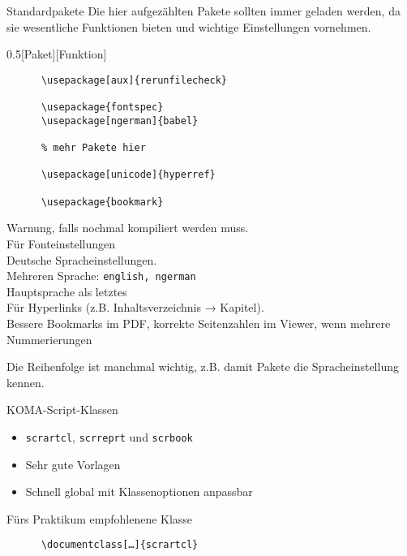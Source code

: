 \begin{frame}[fragile]{Standardpakete}
  Die hier aufgezählten Pakete sollten immer geladen werden, da sie wesentliche Funktionen bieten und wichtige Einstellungen vornehmen.
  \vspace{-1em}
  \begin{CodeExplanation}{0.5}[Paket][Funktion]
    \begin{verbatim}
      \usepackage[aux]{rerunfilecheck}

      \usepackage{fontspec}
      \usepackage[ngerman]{babel}

      % mehr Pakete hier

      \usepackage[unicode]{hyperref}

      \usepackage{bookmark}
    \end{verbatim}
  \Explanation
    Warnung, falls nochmal kompiliert werden muss. \\[\baselineskip]
    Für Fonteinstellungen \\
    Deutsche Spracheinstellungen. \\
    Mehreren Sprache: \texttt{english, ngerman} \\
    Hauptsprache als letztes \\[\baselineskip]
    Für Hyperlinks (z.B. Inhaltsverzeichnis → Kapitel). \\
    Bessere Bookmarks im PDF,
    korrekte Seitenzahlen im Viewer, wenn mehrere Nummerierungen
  \end{CodeExplanation}
  Die Reihenfolge ist manchmal wichtig, z.B. damit Pakete die Spracheinstellung kennen.
\end{frame}

\begin{frame}[fragile]{
  KOMA-Script-Klassen
  \hfill
}
  \begin{itemize}
    \item \texttt{scrartcl}, \texttt{scrreprt} und \texttt{scrbook}
    \item Sehr gute Vorlagen
    \item Schnell global mit Klassenoptionen anpassbar
  \end{itemize}
  \begin{block}{Fürs Praktikum empfohlenene Klasse}
    \begin{verbatim}
      \documentclass[…]{scrartcl}
    \end{verbatim}
  \end{block}
\end{frame}

